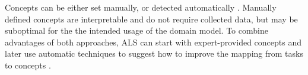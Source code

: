 %
%


Concepts can be either set manually, or detected automatically
\cite{niznan-thesis, rihak-phd}. %
Manually defined concepts are interpretable and do not require collected data,
but may be suboptimal for the the intended usage of the domain model.
To combine advantages of both approaches, ALS can start with expert-provided
concepts and later use automatic techniques to suggest how to improve
the mapping from tasks to concepts \cite[chapter 3]{its-domain-models}.




